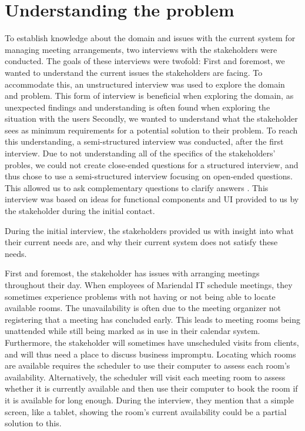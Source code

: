 \section{Understanding the problem}\label{sec:understanding_the_problem} %
To establish knowledge about the domain and issues with the current system for managing meeting arrangements, two interviews with the stakeholders were conducted. 
The goals of these interviews were twofold: 
First and foremost, we wanted to understand the current issues the stakeholders are facing. 
To accommodate this, an unstructured interview was used to explore the domain and problem\cite{benyon2013designing}. 
This form of interview is beneficial when exploring the domain, as unexpected findings and understanding is often found when exploring the situation with the users\cite{benyon2013designing} 
Secondly, we wanted to understand what the stakeholder sees as minimum requirements for a potential solution to their problem. 
To reach this understanding, a semi-structured interview was conducted, after the first interview.
Due to not understanding all of the specifics of the stakeholders' probles, we could not create close-ended questions for a structured interview, and thus chose to use a semi-structured interview focusing on open-ended questions. This allowed us to ask complementary questions to clarify answers \cite{InterviewsNHS}.
This interview was based on ideas for functional components and UI provided to us by the stakeholder during the initial contact.


During the initial interview, the stakeholders provided us with insight into what their current needs are, and why their current system does not satisfy these needs.

First and foremost, the stakeholder has issues with arranging meetings throughout their day.
When employees of Mariendal IT schedule meetings, they sometimes experience problems with not having or not being able to locate available rooms.
The unavailability is often due to the meeting organizer not registering that a meeting has concluded early.
This leads to meeting rooms being unattended while still being marked as in use in their calendar system.
Furthermore, the stakeholder will sometimes have unscheduled visits from clients, and will thus need a place to discuss business impromptu. 
Locating which rooms are available requires the scheduler to use their computer to assess each room's availability.
Alternatively, the scheduler will visit each meeting room to assess whether it is currently available and then use their computer to book the room if it is available for long enough.
During the interview, they mention that a simple screen, like a tablet, showing the room's current availability could be a partial solution to this.

